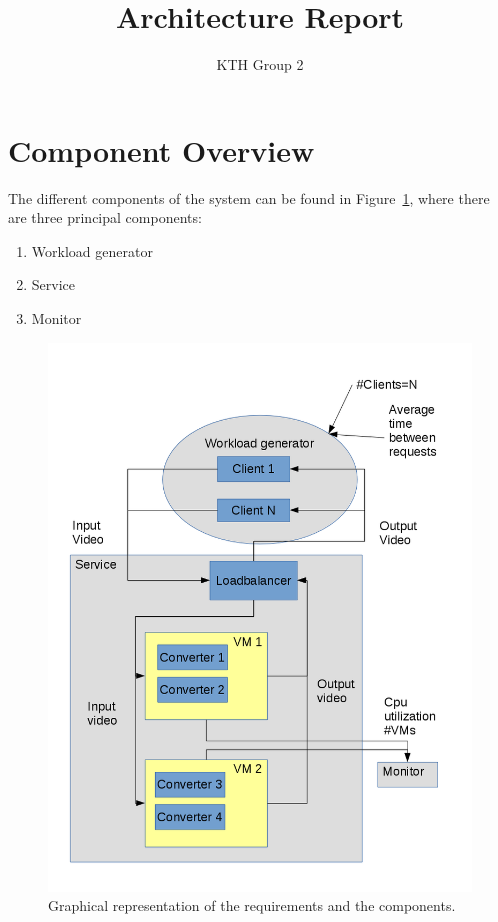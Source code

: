 \documentclass[]{article}
\title{Architecture Report}
\author{KTH Group 2} %
\begin{document}
\maketitle

\section*{Component Overview}
The different components of the system can be found in
Figure~\ref{fig:system_diagram}, where there are three principal
components:
\begin{enumerate}
\item Workload generator
\item Service
\item Monitor
\end{enumerate}

\begin{figure}[!t]
  \centering
  \includegraphics[width=\linewidth]{system_diagram}
  \caption{Graphical representation of the requirements and the
    components.}
  \label{fig:system_diagram}
\end{figure}
\end{document}
